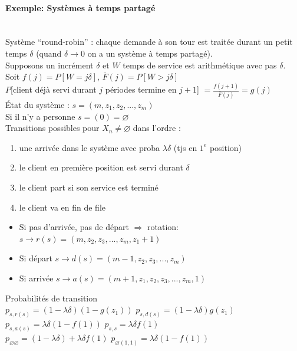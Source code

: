 \documentclass[paper=a4,fontsize=8pt,pagesize,DIV=calc]{scrartcl}
\newcounter{row}
\begin{document}
\begin{multicols}{3}
\paragraph{Exemple: Systèmes à temps partagé}~~\\
Système “round-robin” : chaque demande à son tour est traitée durant un petit temps $\delta$ (quand $\delta\rightarrow 0$ on a
un système à temps partagé).
\\Supposons un incrément $\delta$ et $W$ temps de service est arithmétique avec pas $\delta$. 
\\Soit $f(j) = P[W = j\delta]$, $ \bar{F}(j) = P[W > j\delta ]$
\\$P$[client déjà servi durant $j$ périodes termine en $j + 1$] $=\frac{f(j+1)}{\bar{F}(j)} = g(j)$
\\État du système : $s = (m, z_1, z_2, ... , z_m)$
\\ Si il n’y a personne $s = (0) = \varnothing$
\\Transitions possibles pour $X_n \neq \varnothing$ dans l’ordre :
\begin{enumerate}
\item une arrivée dans le système avec proba $\lambda\delta$ (tjs en $1^e$ position)
\item le client en première position est servi durant $\delta$
\item le client part si son service est terminé
\item le client va en fin de file
\end{enumerate}
\begin{itemize}
\item Si pas d’arrivée, pas de départ $\Rightarrow $ rotation: $s \rightarrow r(s) = (m, z_2, z_3, ... , z_m, z_1 + 1)$
\item Si départ $s \rightarrow d(s) = (m - 1, z_2, z_3, . . . , z_m)$
\item Si arrivée $s\rightarrow a(s) = (m + 1, z_1, z_2, z_3, ... , z_m, 1)$
\end{itemize}
Probabilités de transition
\\$p_{s,r(s)} = (1 - \lambda\delta)(1 - g(z_1))$ \qquad 
$p_{s,d(s)} = (1 -\lambda\delta)g(z_1)$
\\$p_{s,a(s)} = \lambda\delta(1 -f(1))$ \qquad
$p_{s,s} = \lambda\delta f(1)$
\\$p_{\varnothing\varnothing} = (1-\lambda\delta) + \lambda\delta f(1)$ \qquad
$p_{\varnothing(1,1)} = \lambda\delta(1 - f(1))$

\end{multicols}
\end{document}
